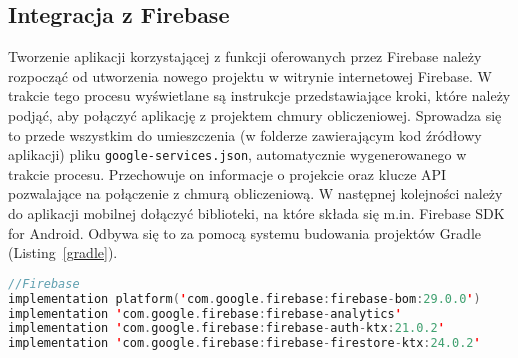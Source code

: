 \newpage
    \subsection{Integracja z Firebase}
    Tworzenie aplikacji korzystającej z funkcji oferowanych przez Firebase należy rozpocząć od utworzenia nowego projektu w witrynie internetowej Firebase. W trakcie tego procesu wyświetlane są instrukcje
    przedstawiające kroki, które należy podjąć, aby połączyć aplikację z projektem chmury obliczeniowej. Sprowadza się to przede wszystkim do umieszczenia (w folderze zawierającym kod źródłowy aplikacji) pliku
    \texttt{google-services.json}, automatycznie wygenerowanego w trakcie procesu. Przechowuje  on informacje o projekcie oraz klucze API pozwalające na połączenie z chmurą obliczeniową. 
    W następnej kolejności należy do aplikacji mobilnej dołączyć biblioteki, na które składa się m.in. Firebase SDK for Android. Odbywa się to za pomocą systemu budowania projektów Gradle (Listing~\ref{gradle}).

    \vspace{0.5cm}
    \begin{lstlisting}[language=Kotlin, caption=Biblioteki Firebase SDK zaimplementowane w aplikacji, label=gradle]
//Firebase
implementation platform('com.google.firebase:firebase-bom:29.0.0')
implementation 'com.google.firebase:firebase-analytics'
implementation 'com.google.firebase:firebase-auth-ktx:21.0.2'
implementation 'com.google.firebase:firebase-firestore-ktx:24.0.2'
    \end{lstlisting}
    \vspace{0.5cm}

